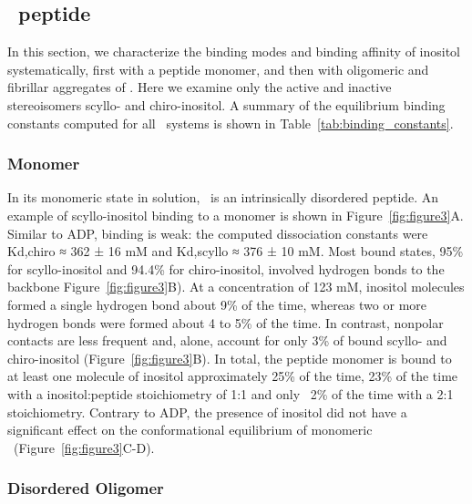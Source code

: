 \subsection{\gafour\ peptide}
In this section, we characterize the binding modes and binding affinity of inositol systematically, first with a peptide monomer, and then with oligomeric and fibrillar aggregates of \gafour. Here we examine only the active and inactive stereoisomers scyllo- and chiro-inositol. A summary of the equilibrium binding constants computed for all \gafour\ systems is shown in Table~\ref{tab:binding_constants}.

\subsubsection{Monomer}
In its monomeric state in solution, \gafour\ is an intrinsically disordered peptide.\cite{Nikolic:2011p57} An example of scyllo-inositol binding to a monomer is shown in Figure~\ref{fig:figure3}A. Similar to ADP, binding is weak: the computed dissociation constants were Kd,chiro ≈ 362 ± 16 mM and Kd,scyllo ≈ 376 ± 10 mM. Most bound states, 95\% for scyllo-inositol and 94.4\% for chiro-inositol, involved hydrogen bonds to the backbone Figure~\ref{fig:figure3}B). At a concentration of 123 mM, inositol molecules formed a single hydrogen bond about 9\% of the time, whereas two or more hydrogen bonds were formed about 4 to 5\% of the time. In contrast, nonpolar contacts are less frequent and, alone, account for only 3\% of bound scyllo- and chiro-inositol (Figure~\ref{fig:figure3}B). In total, the peptide monomer is bound to at least one molecule of inositol approximately 25\% of the time, 23\% of the time with a inositol:peptide stoichiometry of 1:1 and only ~2\% of the time with a 2:1 stoichiometry. Contrary to ADP, the presence of inositol did not have a significant effect on the conformational equilibrium of monomeric \gafour\ (Figure~\ref{fig:figure3}C-D).

\subsubsection{Disordered Oligomer}

